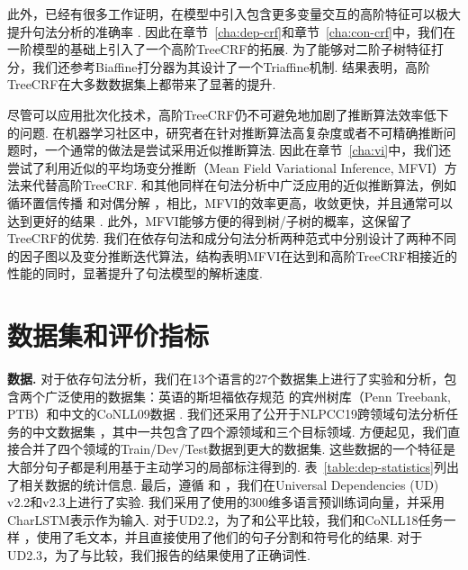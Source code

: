 此外，已经有很多工作证明，在模型中引入包含更多变量交互的高阶特征可以极大提升句法分析的准确率 \citep{mcdonald-pereira-2006-online,chen-manning-2014-fast,ji-etal-2019-graph}.
因此在章节~\ref{cha:dep-crf}和章节~\ref{cha:con-crf}中，我们在一阶模型的基础上引入了一个高阶TreeCRF的拓展.
为了能够对二阶子树特征打分，我们还参考Biaffine打分器为其设计了一个Triaffine机制.
结果表明，高阶TreeCRF在大多数数据集上都带来了显著的提升.

尽管可以应用批次化技术，高阶TreeCRF仍不可避免地加剧了推断算法效率低下的问题.
在机器学习社区中，研究者在针对推断算法高复杂度或者不可精确推断问题时，一个通常的做法是尝试采用近似推断算法.
因此在章节~\ref{cha:vi}中，我们还尝试了利用近似的平均场变分推断（Mean Field Variational Inference, MFVI）方法来代替高阶TreeCRF.
和其他同样在句法分析中广泛应用的近似推断算法，例如循环置信传播 \citep{smith-eisner-2008-dependency}和对偶分解 \citep{martins-etal-2009-concise}，相比，MFVI的效率更高，收敛更快，并且通常可以达到更好的结果 \citep{wang-etal-2019-second}.
此外，MFVI能够方便的得到树/子树的概率，这保留了TreeCRF的优势.
我们在依存句法和成分句法分析两种范式中分别设计了两种不同的因子图以及变分推断迭代算法，结构表明MFVI在达到和高阶TreeCRF相接近的性能的同时，显著提升了句法模型的解析速度.

\section{数据集和评价指标}



\noindent\textbf{数据.}
对于依存句法分析，我们在13个语言的27个数据集上进行了实验和分析，包含两个广泛使用的数据集：英语的斯坦福依存规范 \citep{chen-manning-2014-fast}的宾州树库（Penn Treebank, PTB）和中文的CoNLL09数据 \citep{hajic-etal-2009-conll}.
我们还采用了公开于NLPCC19跨领域句法分析任务的中文数据集 \citep{peng-etal-2019-overview}，其中一共包含了四个源领域和三个目标领域.
方便起见，我们直接合并了四个领域的Train/Dev/Test数据到更大的数据集.
这些数据的一个特征是大部分句子都是利用基于主动学习的局部标注得到的.
表~\ref{table:dep-statistics}列出了相关数据的统计信息.
最后，遵循 \citep{ji-etal-2019-graph}和 \citep{zhang-etal-2019-empirical}，我们在Universal Dependencies (UD) v2.2和v2.3上进行了实验.
我们采用了\citet{zeman-etal-2018-conll}使用的300维多语言预训练词向量，并采用CharLSTM表示作为输入.
对于UD2.2，为了和\citet{ji-etal-2019-graph}公平比较，我们和CoNLL18任务一样 \citep{zeman-etal-2018-conll}，使用了毛文本，并且直接使用了他们的句子分割和符号化的结果.
对于UD2.3，为了与\citet{zhang-etal-2019-empirical}比较，我们报告的结果使用了正确词性.

